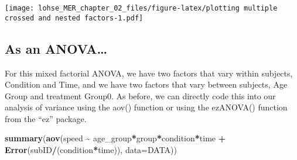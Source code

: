 \documentclass[]{article}
\newenvironment{Shaded}{\begin{snugshade}}{\end{snugshade}}
\newcommand{\DataTypeTok}[1]{\textcolor[rgb]{0.13,0.29,0.53}{#1}}
\newcommand{\KeywordTok}[1]{\textcolor[rgb]{0.13,0.29,0.53}{\textbf{#1}}}
\newcommand{\NormalTok}[1]{#1}
\newcommand{\OperatorTok}[1]{\textcolor[rgb]{0.81,0.36,0.00}{\textbf{#1}}}
\newcommand{\StringTok}[1]{\textcolor[rgb]{0.31,0.60,0.02}{#1}}
\begin{document}
\texttt{[image: lohse\_MER\_chapter\_02\_files/figure-latex/plotting multiple crossed and nested factors-1.pdf]}

\hypertarget{as-an-anova-3}{%
\subsection{As an ANOVA\ldots{}}\label{as-an-anova-3}}

For this mixed factorial ANOVA, we have two factors that vary within
subjects, Condition and Time, and we have two factors that vary between
subjects, Age Group and treatment Group0. As before, we can directly
code this into our analysis of variance using the aov() function or
using the ezANOVA() function from the ``ez'' package.

\begin{Shaded}
\begin{Highlighting}[]
\KeywordTok{summary}\NormalTok{(}\KeywordTok{aov}\NormalTok{(speed }\OperatorTok{\textasciitilde{}}\StringTok{ }\NormalTok{age\_group}\OperatorTok{*}\NormalTok{group}\OperatorTok{*}\NormalTok{condition}\OperatorTok{*}\NormalTok{time }\OperatorTok{+}\StringTok{ }\KeywordTok{Error}\NormalTok{(subID}\OperatorTok{/}\NormalTok{(condition}\OperatorTok{*}\NormalTok{time)), }\DataTypeTok{data=}\NormalTok{DATA))}
\end{Highlighting}
\end{Shaded}
\end{document}
